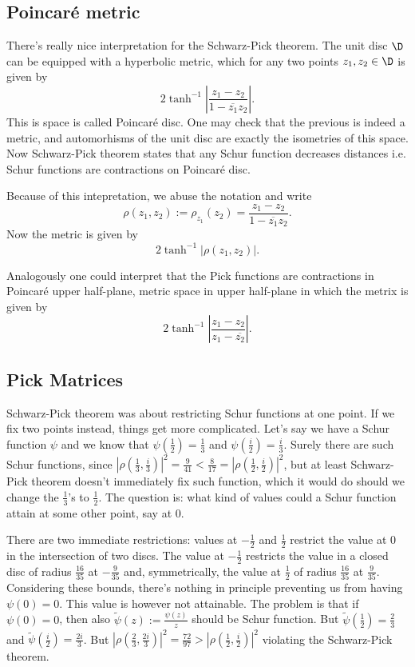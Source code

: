 \subsection{Poincaré metric}

There's really nice interpretation for the Schwarz-Pick theorem. The unit disc $\D$ can be equipped with a hyperbolic metric, which for any two points $z_{1}, z_{2} \in \D$ is given by
\[
	2 \tanh^{-1}\left|\frac{z_{1} - z_{2}}{1 - \overline{z_{1}} z_{2}}\right|.
\]
This is space is called Poincaré disc. One may check that the previous is indeed a metric, and automorhisms of the unit disc are exactly the isometries of this space. Now Schwarz-Pick theorem states that any Schur function decreases distances i.e. Schur functions are contractions on Poincaré disc.

Because of this intepretation, we abuse the notation and write
\[
	\rho(z_{1}, z_{2}) := \rho_{z_{1}}(z_{2}) = \frac{z_{1} - z_{2}}{1 - \overline{z_{1}} z_{2}}.
\]
Now the metric is given by
\[
	2 \tanh^{-1} \left|\rho(z_{1}, z_{2})\right|.
\]

Analogously one could interpret that the Pick functions are contractions in Poincaré upper half-plane, metric space in upper half-plane in which the metrix is given by
\[
	2 \tanh^{-1}\left|\frac{z_{1} - z_{2}}{z_{1} - \overline{z_{2}}}\right|.
\]

\subsection{Pick Matrices}

Schwarz-Pick theorem was about restricting Schur functions at one point. If we fix two points instead, things get more complicated. Let's say we have a Schur function $\psi$ and we know that $\psi(\frac{1}{2}) = \frac{1}{3}$ and $\psi(\frac{i}{2}) = \frac{i}{3}$. Surely there are such Schur functions, since $|\rho(\frac{1}{3}, \frac{i}{3})|^{2} = \frac{9}{41} < \frac{8}{17} = |\rho(\frac{1}{2}, \frac{i}{2})|^{2}$, but at least Schwarz-Pick theorem doesn't immediately fix such function, which it would do should we change the $\frac{1}{3}$'s to $\frac{1}{2}$. The question is: what kind of values could a Schur function attain at some other point, say at $0$.

There are two immediate restrictions: values at $-\frac{1}{2}$ and $\frac{1}{2}$ restrict the value at $0$ in the intersection of two discs. The value at $-\frac{1}{2}$ restricts the value in a closed disc of radius $\frac{16}{35}$ at $-\frac{9}{35}$ and, symmetrically, the value at $\frac{1}{2}$ of radius $\frac{16}{35}$ at $\frac{9}{35}$. Considering these bounds, there's nothing in principle preventing us from having $\psi(0) = 0$. This value is however not attainable. The problem is that if $\psi(0) = 0$, then also $\tilde{\psi}(z) := \frac{\psi(z)}{z}$ should be Schur function. But $\tilde{\psi}(\frac{1}{2}) = \frac{2}{3}$ and $\tilde{\psi}(\frac{i}{2}) = \frac{2 i}{3}$. But $|\rho(\frac{2}{3}, \frac{2i}{3})|^{2} = \frac{72}{97} > |\rho(\frac{1}{2}, \frac{i}{2})|^{2}$ violating the Schwarz-Pick theorem.


